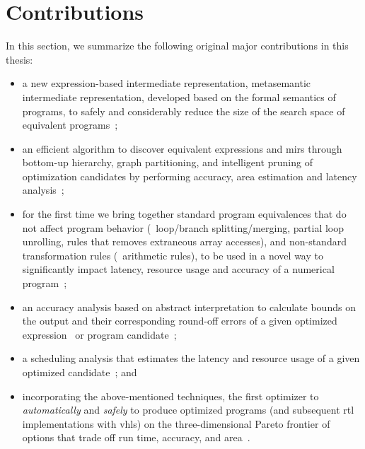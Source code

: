 \section{Contributions}
\label{intro:sec:contributions}

In this section, we summarize the following original major contributions in
this thesis:
\begin{itemize}

    \item a new expression-based intermediate representation, metasemantic
    intermediate representation, developed based on the formal semantics of
    programs, to safely and considerably reduce the size of the search space of
    equivalent programs~\cite{soap2};

    \item an efficient algorithm to discover equivalent expressions and
    \glspl{mir} through bottom-up hierarchy, graph partitioning, and
    intelligent pruning of optimization candidates by performing accuracy, area
    estimation and latency analysis~\cite{soap};

    \item for the first time we bring together standard program equivalences
    that do not affect program behavior (\eg~loop/branch splitting/merging,
    partial loop unrolling, rules that removes extraneous array accesses), and
    non-standard transformation rules (\eg~arithmetic rules), to be used in a
    novel way to significantly impact latency, resource usage and accuracy of a
    numerical program~\cite{soap3};

    \item an accuracy analysis based on abstract interpretation to calculate
    bounds on the output and their corresponding round-off errors of a given
    optimized expression~\cite{soap} or program candidate~\cite{soap2};

    \item a scheduling analysis that estimates the latency and resource usage
    of a given optimized candidate~\cite{soap3}; and

    \item incorporating the above-mentioned techniques, the first optimizer
    to \emph{automatically} and \emph{safely} to produce optimized programs
    (and subsequent \gls{rtl} implementations with \gls{vhls}) on the
    three-dimensional Pareto frontier of options that trade off run time,
    accuracy, and area~\cite{soap3}.

\end{itemize}
